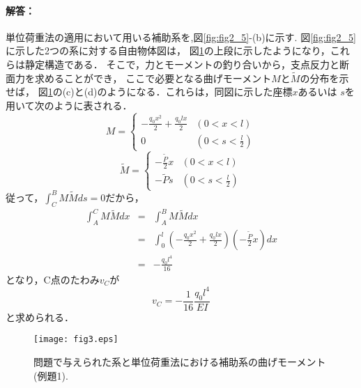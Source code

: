 ﻿\documentclass[10pt,a4j]{jarticle}
\begin{document}
\paragraph{解答：}
単位荷重法の適用において用いる補助系を,図\ref{fig:fig2_5}-(b)に示す.
図\ref{fig:fig2_5}に示した2つの系に対する自由物体図は，
図\ref{fig:fig3}の上段に示したようになり，これらは静定構造である．
そこで，力とモーメントの釣り合いから，支点反力と断面力を求めることができ，
ここで必要となる曲げモーメント$M$と$\tilde M$の分布を示せば，
図\ref{fig:fig3}の(c)と(d)のようになる．これらは，同図に示した座標$x$あるいは
$s$を用いて次のように表される．
\begin{equation}
	M = \left\{
	\begin{array}{cc}
		-\frac{q_0x^2}{2}+\frac{q_0lx}{2} & (0<x<l) \\
		0 & \left( 0< s< \frac{l}{2}\right)
	\end{array}
	\right.
	\label{eqn:}
\end{equation}
\begin{equation}
	\tilde M = \left\{
	\begin{array}{cc}
		-\frac{\tilde P}{2}x & \left( 0<x<l \right) \\
		-\tilde P s & \left( 0< s< \frac{l}{2}\right)
	\end{array}
	\right.
	\label{eqn:}
\end{equation}
従って，$\int_C^B M\tilde Mds=0$だから，
\begin{eqnarray}
	\int_A^CM\tilde M dx & = &  \int_A^BM\tilde M dx  \nonumber \\
	&=&
	\int_0^l
	\left(	-\frac{q_0x^2}{2}+\frac{q_0lx}{2}  \right)
	\left(	-\frac{\tilde P}{2}x \right)
	dx \\
	&= & -\frac{q_0l^4}{16}
	\label{eqn:}
\end{eqnarray}
となり，C点のたわみ$v_C$が
\begin{equation}
	v_C=-\frac{1}{16} \frac{q_0l^4}{EI}
	\label{eqn:}
\end{equation}
と求められる．
\begin{figure}[h]
	\begin{center}
	\texttt{[image: fig3.eps]} 
	\end{center}
	\caption{問題で与えられた系と単位荷重法における補助系の曲げモーメント(例題1).} 
	\label{fig:fig3}
\end{figure}
\end{document}
